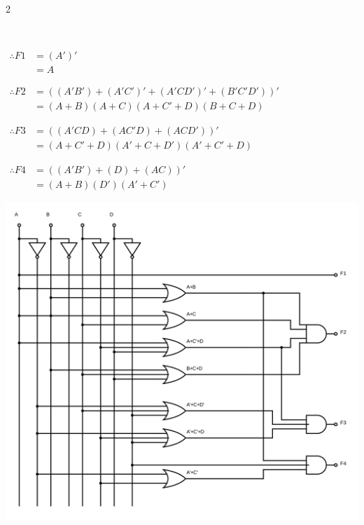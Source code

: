 \documentclass[12pt]{book}
\newenvironment{indented}[1] {
	\begin{list}{}{\setlength{\leftmargin}{#1}}
		\item[]
	}{\end{list}}
\begin{document}
\begin{indented}{5mm}
\begin{multicols}{2}
\begin{karnaugh-map}[4][4][1][(F2) \ CD][AB]
			\end{karnaugh-map}\\
			\begin{karnaugh-map}[4][4][1][(F4) \ CD][AB]

			\end{karnaugh-map}
		\end{multicols}
		
		$\begin{aligned}
			\therefore F1 &= (A')'\\ 
			&= A
		\end{aligned}$

		$\begin{aligned}
			\therefore F2 &= ((A'B') + (A'C')' + (A'CD')' + (B'C'D'))'\\
			&= (A+B)(A+C)(A+C'+D)(B+C+D)
		\end{aligned}$

		$\begin{aligned}
			\therefore F3 &= ((A'CD)+(AC'D)+(ACD'))'\\
			&= (A+C'+D)(A'+C+D')(A'+C'+D)
		\end{aligned}$

		$\begin{aligned}
			\therefore F4 &= ((A'B')+(D)+(AC))'\\
			&= (A+B)(D')(A'+C')
		\end{aligned}$

		\includegraphics[width=6.30in]{q2_xs3-to-aiken}
	\end{indented}
\end{document}
